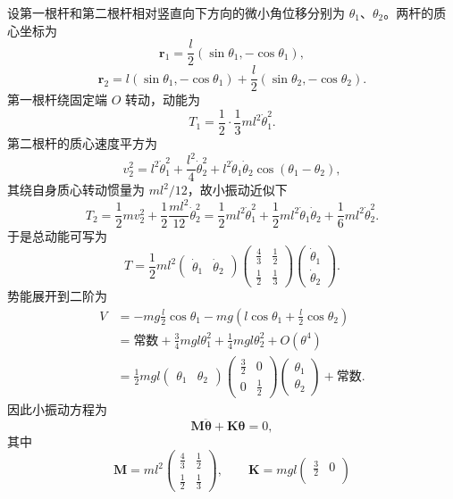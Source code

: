\begin{question}[双匀质杆小振动]
\begin{solution}
设第一根杆和第二根杆相对竖直向下方向的微小角位移分别为 $\theta_1$、$\theta_2$。两杆的质心坐标为
\[
  \bm r_1=\frac l2(\sin\theta_1,-\cos\theta_1),
\]
\[
  \bm r_2=l(\sin\theta_1,-\cos\theta_1)
  +\frac l2(\sin\theta_2,-\cos\theta_2).
\]
第一根杆绕固定端 $O$ 转动，动能为
\[
  T_1=\frac12\cdot\frac13ml^2\dot\theta_1^2.
\]
第二根杆的质心速度平方为
\[
  v_2^2=l^2\dot\theta_1^2+\frac{l^2}{4}\dot\theta_2^2
  +l^2\dot\theta_1\dot\theta_2\cos(\theta_1-\theta_2),
\]
其绕自身质心转动惯量为 $ml^2/12$，故小振动近似下
\[
  T_2=\frac12m v_2^2+\frac12\frac{ml^2}{12}\dot\theta_2^2
  =\frac12ml^2\dot\theta_1^2
   +\frac12ml^2\dot\theta_1\dot\theta_2
   +\frac16ml^2\dot\theta_2^2.
\]
于是总动能可写为
\[
  T=\frac12ml^2
  \begin{pmatrix}\dot\theta_1&\dot\theta_2\end{pmatrix}
  \begin{pmatrix}
    \frac43&\frac12\\[2pt]
    \frac12&\frac13
  \end{pmatrix}
  \begin{pmatrix}\dot\theta_1\\\dot\theta_2\end{pmatrix}.
\]
势能展开到二阶为
\begin{align*}
  V&=-mg\frac l2\cos\theta_1
    -mg\left(l\cos\theta_1+\frac l2\cos\theta_2\right) \\
   &=\text{常数}+\frac34mgl\theta_1^2+\frac14mgl\theta_2^2+O(\theta^4)  \\
   &=\frac12mgl
  \begin{pmatrix}\theta_1&\theta_2\end{pmatrix}
  \begin{pmatrix}
    \frac32&0\\[2pt]
    0&\frac12
  \end{pmatrix}
  \begin{pmatrix}\theta_1\\\theta_2\end{pmatrix}+\text{常数}.
\end{align*}
因此小振动方程为
\[
  \mathbf M\ddot{\bm\theta}+\mathbf K\bm\theta=0,
\]
其中
\[
  \mathbf M=ml^2
  \begin{pmatrix}
    \frac43&\frac12\\[2pt]
    \frac12&\frac13
  \end{pmatrix},
  \qquad
  \mathbf K=mgl
  \begin{pmatrix}
    \frac32&0\\[2pt]

\end{pmatrix}\]
\end{solution}
\end{question}
